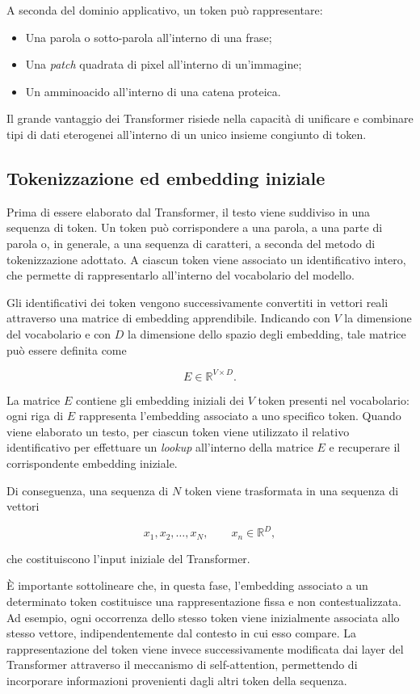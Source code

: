 A seconda del dominio applicativo, un token può rappresentare:
\begin{itemize}
    \item Una parola o sotto-parola all'interno di una frase;
    \item Una \textit{patch} quadrata di pixel all'interno di un'immagine;
    \item Un amminoacido all'interno di una catena proteica.
\end{itemize}
Il grande vantaggio dei Transformer risiede nella capacità di unificare e combinare tipi di dati eterogenei all'interno di un unico insieme congiunto di token.



\subsection{Tokenizzazione ed embedding iniziale}

Prima di essere elaborato dal Transformer, il testo viene suddiviso in una sequenza di token. Un token può corrispondere a una parola, a una parte di parola o, in generale, a una sequenza di caratteri, a seconda del metodo di tokenizzazione adottato. A ciascun token viene associato un identificativo intero, che permette di rappresentarlo all'interno del vocabolario del modello.

Gli identificativi dei token vengono successivamente convertiti in vettori reali attraverso una matrice di embedding apprendibile. Indicando con $V$ la dimensione del vocabolario e con $D$ la dimensione dello spazio degli embedding, tale matrice può essere definita come

$$
E \in \mathbb{R}^{V \times D}.
$$

La matrice $E$ contiene gli embedding iniziali dei $V$ token presenti nel vocabolario: ogni riga di $E$ rappresenta l'embedding associato a uno specifico token. Quando viene elaborato un testo, per ciascun token viene utilizzato il relativo identificativo per effettuare un \textit{lookup} all'interno della matrice $E$ e recuperare il corrispondente embedding iniziale.

Di conseguenza, una sequenza di $N$ token viene trasformata in una sequenza di vettori

$$
x_1,x_2,\ldots,x_N, \qquad x_n \in \mathbb{R}^D,
$$

che costituiscono l'input iniziale del Transformer.

È importante sottolineare che, in questa fase, l'embedding associato a un determinato token costituisce una rappresentazione fissa e non contestualizzata. Ad esempio, ogni occorrenza dello stesso token viene inizialmente associata allo stesso vettore, indipendentemente dal contesto in cui esso compare. La rappresentazione del token viene invece successivamente modificata dai layer del Transformer attraverso il meccanismo di self-attention, permettendo di incorporare informazioni provenienti dagli altri token della sequenza.





